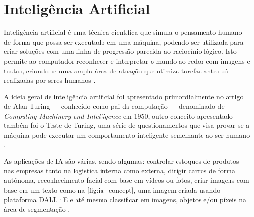 \section{Inteligência Artificial}

Inteligência artificial é uma técnica científica que simula o pensamento humano de forma que possa ser executado em uma máquina, podendo ser utilizada para criar soluções com uma linha de progressão parecida ao raciocínio lógico. Isto permite ao computador reconhecer e interpretar o mundo ao redor com imagens e textos, criando-se uma ampla área de atuação que otimiza tarefas antes só realizadas por seres humanos \space\cite{ia_aliada_ou_inimiga}.



A ideia geral de inteligência artificial foi apresentado primordialmente no artigo de Alan Turing — conhecido como pai da computação — denominado de \textit{Computing Machinery and Intelligence} em 1950, outro conceito apresentado também foi o Teste de Turing, uma série de questionamentos que visa provar se a máquina pode executar um comportamento inteligente semelhante ao ser humano \space\cite{NationalGeographic2023}.

As aplicações de IA são várias, sendo algumas: controlar estoques de produtos nas empresas tanto na logística interna como externa, dirigir carros de forma autônoma, reconhecimento facial com base em vídeos ou fotos, criar imagens com base em um texto como na \cref{fig:ia_concept}, uma imagem criada usando plataforma DALL·E e até mesmo classificar em imagens, objetos e/ou píxeis na área de segmentação \space\cite{Stefanini, OpenAI2021}.

